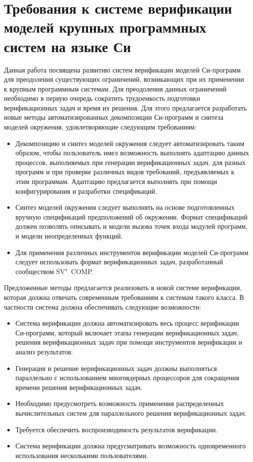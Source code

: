 \section{Требования к системе верификации моделей крупных программных систем на языке Си}
Данная работа посвящена развитию систем верификации моделей Си-программ для преодоления существующих ограничений, возникающих при их применении к крупным программным системам.
Для преодоления данных ограничений необходимо в первую очередь сократить трудоемкость подготовки верификационных задач и время их решения.
Для этого предлагается разработать новые методы автоматизированных декомпозиции Си-программ и синтеза моделей окружения, удовлетворяющие следующим требованиям:
\begin{itemize}
    \item Декомпозицию и синтез моделей окружения следует  автоматизировать таким образом, чтобы пользователь имел возможность выполнять адаптацию данных процессов, выполняемых при генерации верификационных задач, для разных программ и при проверке различных видов требований, предъявляемых к этим программам.
    Адаптацию предлагается выполнять при помощи конфигурирования и разработки спецификаций.
    \item Синтез моделей окружения следует выполнять на основе подготовленных вручную спецификаций предположений об окружении.
    Формат спецификаций должен позволять описывать и модели вызова точек входа модулей программ, и модели неопределенных функций.
    \item Для применения различных инструментов верификации моделей Си-программ следует использовать формат верификационных задач, разработанный сообществом SV"~COMP.
\end{itemize}

Предложенные методы предлагается реализовать в новой системе верификации, которая должна отвечать современным требованиям к системам такого класса.
В частности система должна обеспечивать следующие возможности:
\begin{itemize}
    \item Система верификации должна автоматизировать весь процесс верификации Си-программ, который включает этапы генерации верификационных задач, решения верификационных задач при помощи инструментов верификации и анализ результатов.
    \item Генерация и решение верификационных задач должны выполняться параллельно с использованием многоядерных процессоров для сокращения времени решения верификационных задач.
    \item Необходимо предусмотреть возможность применения распределенных вычислительных систем для параллельного решения верификационных задач.
    \item Требуется обеспечить воспроизводимость результатов верификации. 
    \item Система верификации должна предусматривать возможность одновременного использования несколькими пользователями. 
\end{itemize}
